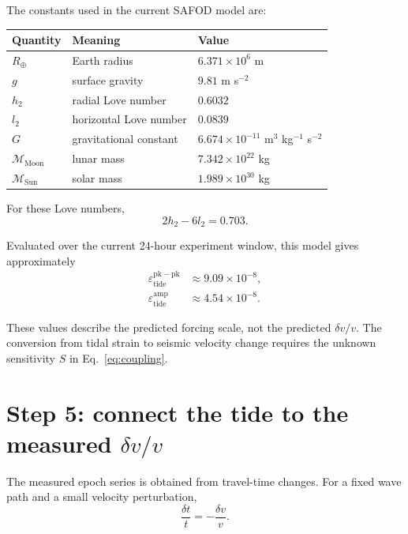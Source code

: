\documentclass[11pt]{article}
\newcommand{\dvv}{\delta v/v}
\newcommand{\eps}{\varepsilon}
\begin{document}
The constants used in the current SAFOD model are:

\begin{center}
\begin{tabular}{@{}lll@{}}
\toprule
Quantity & Meaning & Value \\
\midrule
$R_{\oplus}$ & Earth radius & $6.371\times10^6$ m \\
$g$ & surface gravity & $9.81$ m s$^{-2}$ \\
$h_2$ & radial Love number & $0.6032$ \\
$l_2$ & horizontal Love number & $0.0839$ \\
$G$ & gravitational constant & $6.674\times10^{-11}$ m$^3$ kg$^{-1}$ s$^{-2}$ \\
$\mathcal{M}_{\mathrm{Moon}}$ & lunar mass & $7.342\times10^{22}$ kg \\
$\mathcal{M}_{\mathrm{Sun}}$ & solar mass & $1.989\times10^{30}$ kg \\
\bottomrule
\end{tabular}
\end{center}

For these Love numbers,
\begin{equation}
  2h_2-6l_2 = 0.703.
\end{equation}

Evaluated over the current 24-hour experiment window, this model gives
approximately
\begin{align}
  \eps_{\mathrm{tide}}^{\mathrm{pk-pk}} &\approx 9.09\times10^{-8},\\
  \eps_{\mathrm{tide}}^{\mathrm{amp}} &\approx 4.54\times10^{-8}.
\end{align}

These values describe the predicted forcing scale, not the predicted
$\dvv$.  The conversion from tidal strain to seismic velocity change requires
the unknown sensitivity $S$ in Eq.~\eqref{eq:coupling}.

\section{Step 5: connect the tide to the measured $\dvv$}

The measured epoch series is obtained from travel-time changes.  For a fixed
wave path and a small velocity perturbation,
\begin{equation}
  \frac{\delta t}{t} = -\frac{\delta v}{v}.
  \label{eq:travel_time}
\end{equation}
\end{document}
